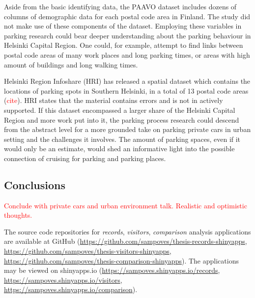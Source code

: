 Aside from the basic identifying data, the PAAVO dataset includes dozens of columns of demographic data for each postal code area in Finland. The study did not make use of these components of the dataset. Employing these variables in parking research could bear deeper understanding about the parking behaviour in Helsinki Capital Region. One could, for example, attempt to find links between postal code areas of many work places and long parking times, or areas with high amount of buildings and long walking times.

Helsinki Region Infoshare (HRI) has released a spatial dataset which contains the locations of parking spots in Southern Helsinki, in a total of 13 postal code areas (\textcolor{red}{cite}). HRI states that the material contains errors and is not in actively supported. If this dataset encompassed a larger share of the Helsinki Capital Region and more work put into it, the parking process research could descend from the abstract level for a more grounded take on parking private cars in urban setting and the challenges it involves. The amount of parking spaces, even if it would only be an estimate, would shed an informative light into the possible connection of cruising for parking and parking places.

\newpage
\subsection{Conclusions}
\justify


\textcolor{red}{Conclude with private cars and urban environment talk. Realistic and optimistic thoughts.}

The source code repositories for \textit{records}, \textit{visitors}, \textit{comparison} analysis applications are available at GitHub (\textcolor{blue}{\url{https://github.com/sampoves/thesis-records-shinyapps}}, \textcolor{blue}{\url{https://github.com/sampoves/thesis-visitors-shinyapps}}, \textcolor{blue}{\url{https://github.com/sampoves/thesis-comparison-shinyapps}}). The applications may be viewed on shinyapps.io (\textcolor{blue}{\url{https://sampoves.shinyapps.io/records}}, \textcolor{blue}{\url{https://sampoves.shinyapps.io/visitors}}, \textcolor{blue}{\url{https://sampoves.shinyapps.io/comparison}}).